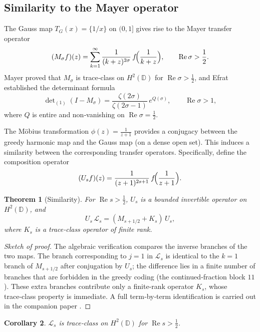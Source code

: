 \documentclass[12pt,a4paper]{article}
\newtheorem{theorem}{Theorem}[section]
\newtheorem{corollary}[theorem]{Corollary}
\theoremstyle{remark}
\begin{document}
\subsection{Similarity to the Mayer operator}
\label{sec:similarity}

The Gauss map $T_G(x)=\{1/x\}$ on $(0,1]$ gives rise to the Mayer transfer operator
\[
(M_\sigma f)(z) = \sum_{k=1}^\infty \frac{1}{(k+z)^{2\sigma}} \, f\!\Bigl(\frac{1}{k+z}\Bigr),
\qquad \operatorname{Re}\sigma>\frac12.
\]
Mayer \cite{Mayer90} proved that $M_\sigma$ is trace‑class on $H^2(\mathbb{D})$ for $\operatorname{Re}\sigma>\frac12$, and Efrat \cite{Efrat93} established the determinant formula
\begin{equation}\label{eq:Mayerdet}
\det\nolimits_{(1)}(I-M_\sigma)=\frac{\zeta(2\sigma)}{\zeta(2\sigma-1)}\,e^{Q(\sigma)},
\qquad\operatorname{Re}\sigma>1,
\end{equation}
where $Q$ is entire and non‑vanishing on $\operatorname{Re}\sigma=\frac12$.

The Möbius transformation $\phi(z)=\frac1{z+1}$ provides a conjugacy between the greedy harmonic map and the Gauss map (on a dense open set).
This induces a similarity between the corresponding transfer operators.
Specifically, define the composition operator
\[
(U_s f)(z) = \frac{1}{(z+1)^{2s+1}}\, f\!\Bigl(\frac{1}{z+1}\Bigr).
\]

\begin{theorem}[Similarity]\label{thm:similarity}
For $\operatorname{Re}s>\frac12$, $U_s$ is a bounded invertible operator on $H^2(\mathbb{D})$, and
\[
U_s\,\mathcal{L}_s = (M_{s+1/2}+K_s)\,U_s,
\]
where $K_s$ is a trace‑class operator of finite rank.
\end{theorem}
\begin{proof}[Sketch of proof]
The algebraic verification compares the inverse branches of the two maps.
The branch corresponding to $j=1$ in $\mathcal{L}_s$ is identical to the $k=1$ branch of $M_{s+1/2}$ after conjugation by $U_s$;
the difference lies in a finite number of branches that are forbidden in the greedy coding (the continued‑fraction block $11$).
These extra branches contribute only a finite‑rank operator $K_s$, whose trace‑class property is immediate.
A full term‑by‑term identification is carried out in the companion paper \cite{Geere2026}.
\end{proof}

\begin{corollary}\label{cor:traceclass}
$\mathcal{L}_s$ is trace‑class on $H^2(\mathbb{D})$ for $\operatorname{Re}s>\frac12$.
\end{corollary}
\end{document}

